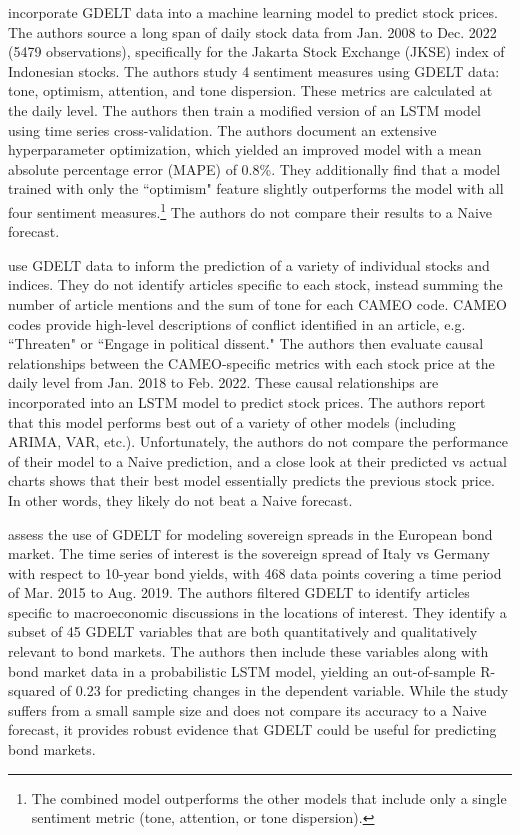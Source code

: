 \documentclass[12pt]{article}
\begin{document}
\textcite{nashir2023indonesian} incorporate GDELT data into a machine learning model to predict stock prices. The authors source a long span of daily stock data from Jan. 2008 to Dec. 2022 (5479 observations), specifically for the Jakarta Stock Exchange (JKSE) index of Indonesian stocks. The authors study 4 sentiment measures using GDELT data: tone, optimism, attention, and tone dispersion. These metrics are calculated at the daily level. The authors then train a modified version of an LSTM model using time series cross-validation. The authors document an extensive hyperparameter optimization, which yielded an improved model with a mean absolute percentage error (MAPE) of 0.8\%. They additionally find that a model trained with only the ``optimism" feature slightly outperforms the model with all four sentiment measures.\footnote{The combined model outperforms the other models that include only a single sentiment metric (tone, attention, or tone dispersion).} The authors do not compare their results to a Naive forecast.

\textcite{wang2024ensemble} use GDELT data to inform the prediction of a variety of individual stocks and indices. They do not identify articles specific to each stock, instead summing the number of article mentions and the sum of tone for each CAMEO code. CAMEO codes provide high-level descriptions of conflict identified in an article, e.g. ``Threaten" or ``Engage in political dissent." The authors then evaluate causal relationships between the CAMEO-specific metrics with each stock price at the daily level from Jan. 2018 to Feb. 2022. These causal relationships are incorporated into an LSTM model to predict stock prices. The authors report that this model performs best out of a variety of other models (including ARIMA, VAR, etc.). Unfortunately, the authors do not compare the performance of their model to a Naive prediction, and a close look at their predicted vs actual charts shows that their best model essentially predicts the previous stock price. In other words, they likely do not beat a Naive forecast.

\textcite{consoli2021information} assess the use of GDELT for modeling sovereign spreads in the European bond market. The time series of interest is the sovereign spread of Italy vs Germany with respect to 10-year bond yields, with 468 data points covering a time period of Mar. 2015 to Aug. 2019. The authors filtered GDELT to identify articles specific to macroeconomic discussions in the locations of interest. They identify a subset of 45 GDELT variables that are both quantitatively and qualitatively relevant to bond markets. The authors then include these variables along with bond market data in a probabilistic LSTM model, yielding an out-of-sample R-squared of 0.23 for predicting changes in the dependent variable. While the study suffers from a small sample size and does not compare its accuracy to a Naive forecast, it provides robust evidence that GDELT could be useful for predicting bond markets.
\end{document}
